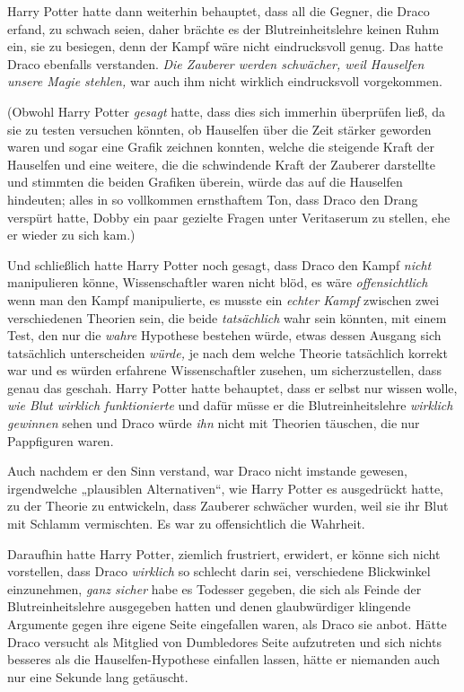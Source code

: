 {Harry Potter hatte dann weiterhin behauptet, dass all die Gegner, die Draco erfand, zu schwach seien, daher brächte es der Blutreinheitslehre keinen Ruhm ein, sie zu besiegen, denn der Kampf wäre nicht eindrucksvoll genug. Das hatte Draco ebenfalls verstanden. \emph{Die Zauberer werden schwächer, weil Hauselfen unsere Magie stehlen,} war auch ihm nicht wirklich eindrucksvoll vorgekommen.

(Obwohl Harry Potter \emph{gesagt} hatte, dass dies sich immerhin überprüfen ließ, da sie zu testen versuchen könnten, ob Hauselfen über die Zeit stärker geworden waren und sogar eine Grafik zeichnen konnten, welche die steigende Kraft der Hauselfen und eine weitere, die die schwindende Kraft der Zauberer darstellte und stimmten die beiden Grafiken überein, würde das auf die Hauselfen hindeuten; alles in so vollkommen ernsthaftem Ton, dass Draco den Drang verspürt hatte, Dobby ein paar gezielte Fragen unter Veritaserum zu stellen, ehe er wieder zu sich kam.)

Und schließlich hatte Harry Potter noch gesagt, dass Draco den Kampf \emph{nicht} manipulieren könne, Wissenschaftler waren nicht blöd, es wäre \emph{offensichtlich} wenn man den Kampf manipulierte, es musste ein \emph{echter Kampf} zwischen zwei verschiedenen Theorien sein, die beide \emph{tatsächlich} wahr sein könnten, mit einem Test, den nur die \emph{wahre} Hypothese bestehen würde, etwas dessen Ausgang sich tatsächlich unterscheiden \emph{würde,} je nach dem welche Theorie tatsächlich korrekt war und es würden erfahrene Wissenschaftler zusehen, um sicherzustellen, dass genau das geschah. Harry Potter hatte behauptet, dass er selbst nur wissen wolle, \emph{wie Blut wirklich funktionierte} und dafür müsse er die Blutreinheitslehre \emph{wirklich} \emph{gewinnen} sehen und Draco würde \emph{ihn} nicht mit Theorien täuschen, die nur Pappfiguren waren.

Auch nachdem er den Sinn verstand, war Draco nicht imstande gewesen, irgendwelche „plausiblen Alternativen“, wie Harry Potter es ausgedrückt hatte, zu der Theorie zu entwickeln, dass Zauberer schwächer wurden, weil sie ihr Blut mit Schlamm vermischten. Es war zu offensichtlich die Wahrheit.

Daraufhin hatte Harry Potter, ziemlich frustriert, erwidert, er könne sich nicht vorstellen, dass Draco \emph{wirklich} so schlecht darin sei, verschiedene Blickwinkel einzunehmen, \emph{ganz sicher} habe es Todesser gegeben, die sich als Feinde der Blutreinheitslehre ausgegeben hatten und denen glaubwürdiger klingende Argumente gegen ihre eigene Seite eingefallen waren, als Draco sie anbot. Hätte Draco versucht als Mitglied von Dumbledores Seite aufzutreten und sich nichts besseres als die Hauselfen-Hypothese einfallen lassen, hätte er niemanden auch nur eine Sekunde lang getäuscht.

}
